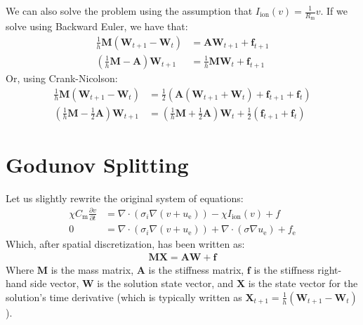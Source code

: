 \documentclass{article}
\newcommand{\bvec}[1]{\boldsymbol{#1}}
\newcommand{\bmat}[1]{\boldsymbol{#1}}
\begin{document}
We can also solve the problem using the assumption that $I_\text{ion}(v) = \frac{1}{R_\text{m}} v$.
If we solve using Backward Euler, we have that:
\begin{align*}
    \frac{1}{h} \bmat{M} (\bvec{W}_{t + 1} - \bvec{W}_t) & = \bmat{A} \bvec{W}_{t + 1} + \bvec{f}_{t + 1} \\
    (\frac{1}{h} \bmat{M} - \bmat{A}) \bvec{W}_{t + 1} & = \frac{1}{h} \bmat{M} \bvec{W}_t + \bvec{f}_{t + 1}
\end{align*}
\noindent Or, using Crank-Nicolson:
\begin{align*}
    \frac{1}{h} \bmat{M} (\bvec{W}_{t + 1} - \bvec{W}_t)
        & = \frac{1}{2} (\bmat{A} (\bvec{W}_{t + 1} + \bvec{W}_t) + \bvec{f}_{t + 1} + \bvec{f}_t) \\
    (\frac{1}{h} \bmat{M} - \frac{1}{2} \bmat{A}) \bvec{W}_{t + 1}
        & = (\frac{1}{h} \bmat{M} + \frac{1}{2} \bmat{A}) \bvec{W}_t + \frac{1}{2} (\bvec{f}_{t + 1} + \bvec{f}_t)
\end{align*}

\newpage

\section{Godunov Splitting}

Let us slightly rewrite the original system of equations:
\begin{align*}
    \chi C_\text{m} \frac{\partial v}{\partial t}
        & = \nabla \cdot (\sigma_i \nabla (v + u_\text{e})) - \chi I_\text{ion}(v) + f \\
    0
        & = \nabla \cdot (\sigma_i \nabla (v + u_\text{e})) + \nabla \cdot (\sigma \nabla u_\text{e}) + f_\text{e}
\end{align*}
\noindent Which, after spatial discretization, has been written as:
\begin{align*}
    \bmat{M} \bvec{X} = \bmat{A} \bvec{W} + \bvec{f}
\end{align*}
\noindent Where $\bmat{M}$ is the mass matrix,
$\bmat{A}$ is the stiffness matrix,
$\bvec{f}$ is the stiffness right-hand side vector,
$\bvec{W}$ is the solution state vector,
and $\bvec{X}$ is the state vector for the solution's time derivative
(which is typically written as $\bvec{X}_{t + 1} = \frac{1}{h}(\bvec{W}_{t + 1} - \bvec{W}_t)$).
\end{document}
